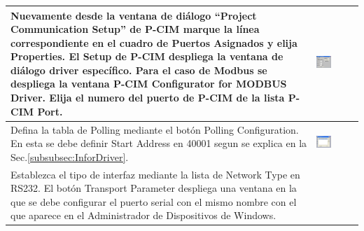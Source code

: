 \begin{table}[!ht]
\centering
\renewcommand*{\arraystretch}{0.01}
\begin{tabular}{*{2}{m{}}}
\hline
  Nuevamente desde la ventana de diálogo “Project Communication Setup” de 
  P-CIM marque la línea correspondiente en el cuadro de Puertos Asignados y 
  elija  Properties. El Setup de P-CIM despliega la ventana de diálogo driver 
  específico. Para el caso de Modbus se despliega la ventana P-CIM Configurator 
  for MODBUS Driver. Elija el numero del puerto de P-CIM de la lista P-CIM Port.
  &\begin{center}
    \includegraphics[width=0.4\textwidth]
      {Cap5-SCADA/images/modbusDriver.jpeg}
  \end{center}\\
\hline
  Defina la tabla de Polling mediante el botón Polling Configuration. En esta 
  se debe definir Start Address en 40001 segun se explica en la 
  Sec.\ref{subsubsec:InforDriver}.
  &\begin{center}
        \includegraphics[width=0.4\textwidth]
      {Cap5-SCADA/images/modbusDriver1.jpeg}
  \end{center}\\
\hline 
   Establezca el tipo de interfaz mediante la lista de Network Type en RS232. 
   El botón Transport Parameter despliega una ventana en la que se debe 
   configurar el puerto serial con  el 
   mismo nombre con el que aparece en el Administrador de Dispositivos de 
   Windows.
  &\begin{center}

\end{center}
\end{tabular}
\end{table}
